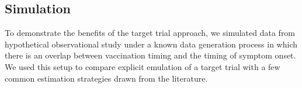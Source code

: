 \begin{appendix}

    

    
    \subsection{Simulation}
    To demonstrate the benefits of the target trial approach, we simulated data from hypothetical observational study under a known data generation process in which there is an overlap between vaccination timing and the timing of symptom onset. We used this setup to compare explicit emulation of a target trial with a few common estimation strategies drawn from the literature. 


\end{appendix}
